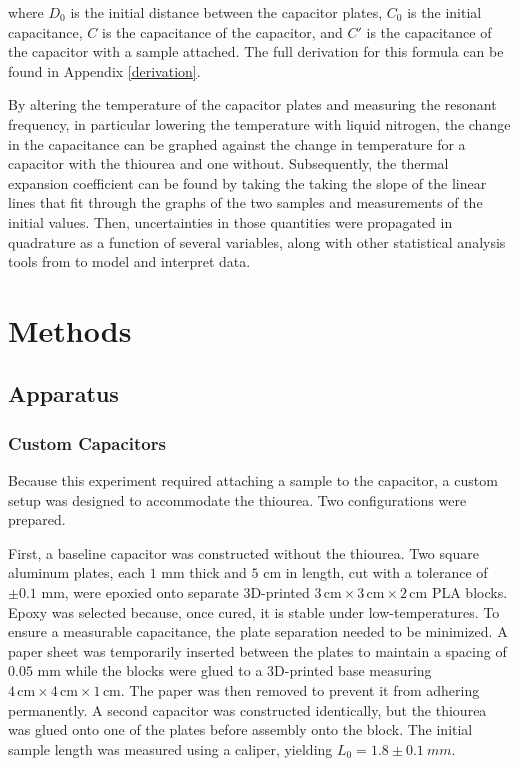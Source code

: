 \documentclass[letterpaper,12pt]{article}
\begin{document}
where $D_0$ is the initial distance between the capacitor plates, $C_0$ is the initial capacitance, $C$ is the capacitance of the capacitor, and $C'$ is the capacitance of the capacitor with a sample attached. The full derivation for this formula can be found in Appendix \ref{derivation}.



By altering the temperature of the capacitor plates and measuring the resonant frequency, in particular lowering the temperature with liquid nitrogen, the change in the capacitance can be graphed against the change in temperature for a capacitor with the thiourea and one without. Subsequently, the thermal expansion coefficient can be found by taking the taking the slope of the linear lines that fit through the graphs of the two samples and measurements of the initial values. Then, uncertainties in those quantities were propagated in quadrature as a function of several variables, along with other statistical analysis tools from \cite{textbook1} to model and interpret data. 

\section{Methods}

\subsection{Apparatus}

\subsubsection{Custom Capacitors}

Because this experiment required attaching a sample to the capacitor, a custom setup was designed to accommodate the thiourea. Two configurations were prepared.

First, a baseline capacitor was constructed without the thiourea. Two square aluminum plates, each $1$ mm thick and $5$ cm in length, cut with a tolerance of $\pm 0.1$ mm, were epoxied onto separate 3D-printed $3 \,\text{cm} \times 3 \,\text{cm} \times 2 \,\text{cm}$ PLA blocks. Epoxy was selected because, once cured, it is stable under low-temperatures. To ensure a measurable capacitance, the plate separation needed to be minimized. A paper sheet was temporarily inserted between the plates to maintain a spacing of $0.05$ mm while the blocks were glued to a 3D-printed base measuring $4 \,\text{cm} \times 4 \,\text{cm} \times 1 \,\text{cm}$. The paper was then removed to prevent it from adhering permanently. A second capacitor was constructed identically, but the thiourea was glued onto one of the plates before assembly onto the block. The initial sample length was measured using a caliper, yielding $L_0 = 1.8\pm0.1\ mm$.
\end{document}
